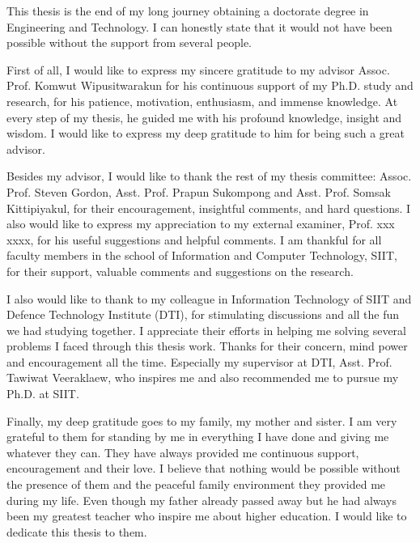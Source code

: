 %

This thesis is the end of my long journey obtaining a doctorate degree in Engineering and Technology. 
I can honestly state that it would not have been possible without the support from several people.

First of all, I would like to express my sincere gratitude to my advisor Assoc. Prof. Komwut Wipusitwarakun for his continuous support of my Ph.D. study and research, for his patience, motivation, enthusiasm, and immense knowledge.
At every step of my thesis, he guided me with his profound knowledge, insight and wisdom.
I would like to express my deep gratitude to him for being such a great advisor. 

Besides my advisor, I would like to thank the rest of my thesis committee: Assoc. Prof. Steven Gordon, Asst. Prof. Prapun Sukompong and Asst. Prof. Somsak Kittipiyakul, for their encouragement, insightful comments, and hard questions. I also would like to express my appreciation to my external examiner, Prof. xxx xxxx, for his useful suggestions and helpful comments. 
I am thankful for all faculty members in the school of Information and Computer Technology, SIIT, for their support, valuable comments and suggestions on the research.

I also would like to thank to my colleague in Information Technology of SIIT and Defence Technology Institute (DTI), for stimulating discussions and all the fun we had studying together. 
I appreciate their efforts in helping me solving several problems I faced through this thesis work.
Thanks for their concern, mind power and encouragement all the time.
Especially my supervisor at DTI, Asst. Prof. Tawiwat Veeraklaew, who inspires me and also recommended me to pursue my Ph.D. at SIIT.

Finally, my deep gratitude goes to my family, my mother and sister.
I am very grateful to them for standing by me in everything I have done and giving me whatever they can.
They have always provided me continuous support, encouragement and their love.
I believe that nothing would be possible without the presence of them and the peaceful family environment they provided me during my life.
Even though my father already passed away but he had always been my greatest teacher who inspire me about higher education. 
I would like to dedicate this thesis to them.